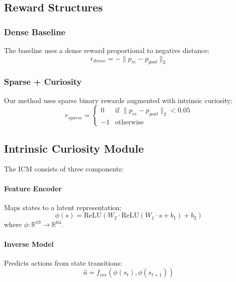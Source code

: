 \documentclass{article}
\begin{document}
\subsection{Reward Structures}

\subsubsection{Dense Baseline}
The baseline uses a dense reward proportional to negative distance:
\begin{equation}
    r_{dense} = -\|p_{ee} - p_{goal}\|_2
\end{equation}

\subsubsection{Sparse + Curiosity}
Our method uses sparse binary rewards augmented with intrinsic curiosity:
\begin{equation}
    r_{sparse} = \begin{cases}
        0 & \text{if } \|p_{ee} - p_{goal}\|_2 < 0.05 \\
        -1 & \text{otherwise}
    \end{cases}
\end{equation}

\subsection{Intrinsic Curiosity Module}

The ICM consists of three components:

\paragraph{Feature Encoder} Maps states to a latent representation:
\begin{equation}
    \phi(s) = \text{ReLU}(W_2 \cdot \text{ReLU}(W_1 \cdot s + b_1) + b_2)
\end{equation}
where $\phi: \mathbb{R}^{19} \rightarrow \mathbb{R}^{64}$.

\paragraph{Inverse Model} Predicts actions from state transitions:
\begin{equation}
    \hat{a} = f_{inv}(\phi(s_t), \phi(s_{t+1}))
\end{equation}
\end{document}
